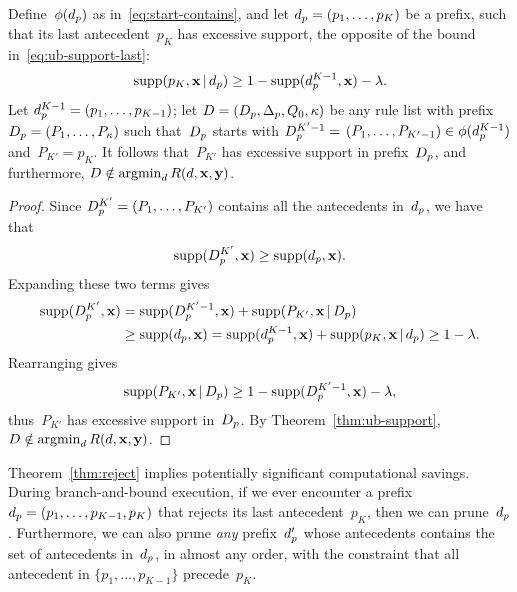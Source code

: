 \begin{proposition}
\label{prop:ub-support}
Define~$\phi(d_p)$ as in~\eqref{eq:start-contains},
and let ${d_p = (p_1, \dots, p_{K})}$ be a prefix,
such that its last antecedent~$p_{K}$ has excessive support,
\ie the opposite of the bound in~\eqref{eq:ub-support-last}:
\begin{align}
\Supp(p_K, \x \given \Prefix) \ge 1 - \Supp(\Prefix^{K-1}, \x) - \Reg.
\end{align}
Let ${d_p^{K-1} = (p_1, \dots, p_{K-1})}$;
let ${{D} = (D_p, \Delta_p, Q_0, \kappa)}$
be any rule list with prefix
${D_p = (P_1, \dots, P_{\kappa})}$
such that~$D_p$ starts with ${D_p^{K'-1} =}$
${(P_1, \dots, P_{K'-1}) \in \phi(d_p^{K-1})}$
and~${P_{K'} = p_{K}}$.
%
It follows that~$P_{K'}$ has excessive support in prefix~$D_p$,
and furthermore, ${{D} \notin \operatorname*{argmin}_{{d}} R({d}, \mathbf{x}, \mathbf{y})}$.
\end{proposition}

\begin{proof}
Since ${D_p^{K'} = (P_1, \dots, P_{K'})}$
contains all the antecedents in~$d_p$, we have that
\begin{align}
\Supp(\PrefixB^{K'}, \x) \ge \Supp(\Prefix, \x).
\end{align}
Expanding these two terms gives
\begin{align}
\Supp(\PrefixB^{K'}, \x)
&= \Supp(\PrefixB^{K'-1}, \x) + \Supp(P_{K'}, \x \given \PrefixB) \nn \\
&\ge \Supp(\Prefix, \x)
= \Supp(\Prefix^{K-1}, \x) + \Supp(p_K, \x \given \Prefix)
\ge 1 - \Reg.
\end{align}
Rearranging gives
\begin{align}
\Supp(P_{K'}, \x \given \PrefixB)
\ge 1 - \Supp(\PrefixB^{K'-1}, \x) - \Reg,
\end{align}
thus~$P_{K'}$ has excessive support in~$D_p$.
%
By Theorem~\ref{thm:ub-support},
${{D} \notin \operatorname*{argmin}_{{d}} R({d}, \mathbf{x}, \mathbf{y})}$.
\end{proof}

Theorem~\ref{thm:reject} implies potentially significant
computational savings.
%
During branch-and-bound execution, if we ever encounter a
prefix ${d_p = (p_1, \dots, p_{K-1}, p_K)}$ that rejects its
last antecedent~$p_K$, then we can prune~$d_p$.
%
Furthermore, we can also prune \emph{any} prefix~$d_p'$
whose antecedents contains the set of antecedents in~$d_p$,
in almost any order, with the constraint that all antecedent
in ${\{p_1, \dots, p_{K-1}\}}$ precede~$p_K$.

